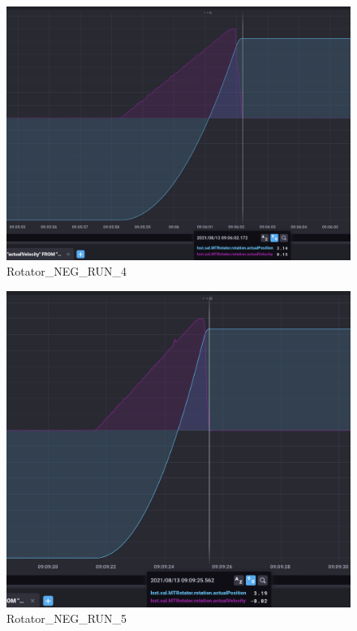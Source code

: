 \documentclass[SE,authoryear,toc, lsstdraft]{lsstdoc}
\begin{document}
\begin{figure}
  \includegraphics[width=\linewidth]{media/rotator_neg_4.png}
  \caption{Rotator\_NEG\_RUN\_4}
  \label{fig:Rotator_NEG_RUN_4}
\end{figure}

\begin{figure}
  \includegraphics[width=\linewidth]{media/rotator_neg_5.png}
  \caption{Rotator\_NEG\_RUN\_5}
  \label{fig:Rotator_NEG_RUN_5}
\end{figure}
\newpage
\end{document}
